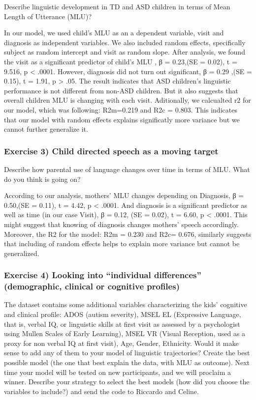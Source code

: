 \documentclass[]{article}
\begin{document}
Describe linguistic development in TD and ASD children in terms of Mean
Length of Utterance (MLU)?

In our model, we used child's MLU as an a dependent variable, visit and
diagnosis as independent variables. We also included random effects,
specifically subject as random intercept and visit as random slope.
After analysis, we found the visit as a significant predictor of child's
MLU , β = 0.23,(SE = 0.02), t = 9.516, p \textless{} .0001. However,
diagnosis did not turn out significant, β = 0.29 ,(SE = 0.15), t = 1.91,
p \textgreater{} .05. The result indicates that ASD children's
linguistic performance is not different from non-ASD children. But it
also suggests that overall children MLU is changing with each visit.
Aditionally, we calcualted r2 for our model, which was following:
R2m=0.219 and R2c = 0.803. This indicates that our model with random
effects explains significatly more variance but we cannot further
generalize it.

\subsubsection{Exercise 3) Child directed speech as a moving
target}\label{exercise-3-child-directed-speech-as-a-moving-target}

Describe how parental use of language changes over time in terms of MLU.
What do you think is going on?

According to our analysis, mothers' MLU changes depending on Diagnosis,
β = 0.50,(SE = 0.11), t = 4.42, p \textless{} .0001. And diagnosis is a
significant predictor as well as time (in our case Visit), β = 0.12, (SE
= 0.02), t = 6.60, p \textless{} .0001. This might suggest that knowing
of diagnosis changes mothers' speech accordingly. Moreover, the R2 for
the model: R2m = 0.230 and R2c= 0.676, similarly suggests that including
of random effects helps to explain more variance but cannot be
generalized.

\subsubsection{\texorpdfstring{Exercise 4) Looking into ``individual
differences'' (demographic, clinical or cognitive
profiles)}{Exercise 4) Looking into individual differences (demographic, clinical or cognitive profiles)}}\label{exercise-4-looking-into-individual-differences-demographic-clinical-or-cognitive-profiles}

The dataset contains some additional variables characterizing the kids'
cognitive and clinical profile: ADOS (autism severity), MSEL EL
(Expressive Language, that is, verbal IQ, or linguistic skills at first
visit as assessed by a psychologist using Mullen Scales of Early
Learning), MSEL VR (Visual Reception, used as a proxy for non verbal IQ
at first visit), Age, Gender, Ethnicity. Would it make sense to add any
of them to your model of linguistic trajectories? Create the best
possible model (the one that best explain the data, with MLU as
outcome). Next time your model will be tested on new participants, and
we will proclaim a winner. Describe your strategy to select the best
models (how did you choose the variables to include?) and send the code
to Riccardo and Celine.
\end{document}
